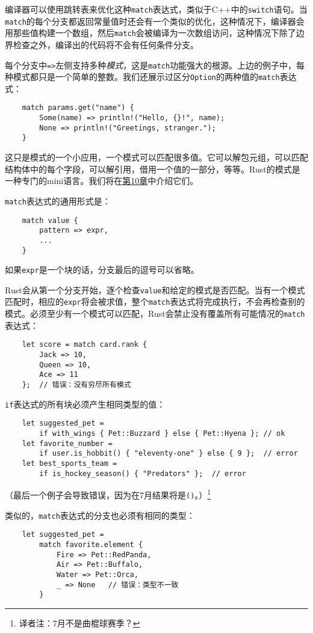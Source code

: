 编译器可以使用跳转表来优化这种\texttt{match}表达式，类似于C++中的\texttt{switch}语句。当\texttt{match}的每个分支都返回常量值时还会有一个类似的优化，这种情况下，编译器会用那些值构建一个数组，然后\texttt{match}会被编译为一次数组访问，这种情况下除了边界检查之外，编译出的代码将不会有任何条件分支。

每个分支中\texttt{=>}左侧支持多种\emph{模式}，这是\texttt{match}功能强大的根源。上边的例子中，每种模式都只是一个简单的整数。我们还展示过区分\texttt{Option}的两种值的\texttt{match}表达式：
\begin{verbatim}
    match params.get("name") {
        Some(name) => println!("Hello, {}!", name);
        None => println!("Greetings, stranger.");
    }
\end{verbatim}

这只是模式的一个小应用，一个模式可以匹配很多值。它可以解包元组，可以匹配结构体中的每个字段，可以解引用，借用一个值的一部分，等等。Rust的模式是一种专门的mini语言。我们将在\hyperref[ch10]{第10章}中介绍它们。

\texttt{match}表达式的通用形式是：
\begin{verbatim}
    match value {
        pattern => expr,
        ...
    }
\end{verbatim}
如果\texttt{expr}是一个块的话，分支最后的逗号可以省略。

Rust会从第一个分支开始，逐个检查\texttt{value}和给定的模式是否匹配。当有一个模式匹配时，相应的\texttt{expr}将会被求值，整个\texttt{match}表达式将完成执行，不会再检查别的模式。必须至少有一个模式可以匹配，Rust会禁止没有覆盖所有可能情况的\texttt{match}表达式：
\begin{verbatim}
    let score = match card.rank {
        Jack => 10,
        Queen => 10,
        Ace => 11
    };  // 错误：没有穷尽所有模式
\end{verbatim}

\texttt{if}表达式的所有块必须产生相同类型的值：
\begin{verbatim}
    let suggested_pet = 
        if with_wings { Pet::Buzzard } else { Pet::Hyena }; // ok
    let favorite_number =
        if user.is_hobbit() { "eleventy-one" } else { 9 };  // error
    let best_sports_team = 
        if is_hockey_season() { "Predators" };  // error
\end{verbatim}
（最后一个例子会导致错误，因为在7月结果将是\texttt{()}。）\footnote{译者注：7月不是曲棍球赛季？}

类似的，\texttt{match}表达式的分支也必须有相同的类型：
\begin{verbatim}
    let suggested_pet =
        match favorite.element {
            Fire => Pet::RedPanda,
            Air => Pet::Buffalo,
            Water => Pet::Orca,
            _ => None   // 错误：类型不一致
        }
\end{verbatim}

